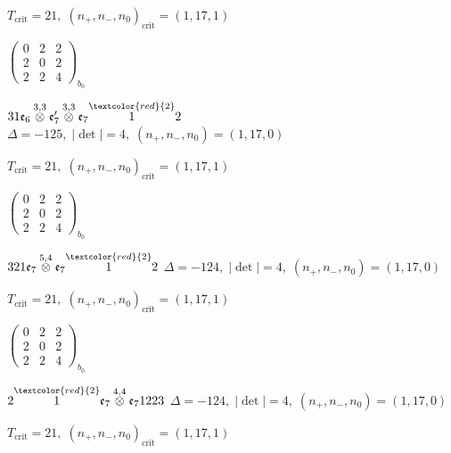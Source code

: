 \documentclass[10pt]{article}
\begin{document}
\hspace{1em}$T_{\text{crit}}=21,\; (n_+,n_-,n_0)_{\text{crit}}=(1,17,1)$

\hspace{2em}$\left(\begin{smallmatrix}0 & 2 & 2 \\ 2 & 0 & 2 \\ 2 & 2 & 4\end{smallmatrix}\right)_{\!b_0}$

\smallskip

$31\mathfrak{e}_6\overset{3,3}{\otimes}\mathfrak{e}_7'\overset{3,3}{\otimes}\mathfrak{e}_7\overset{\textcolor{red}{2}}{1}2$ \quad $\Delta=-125,\; |\det|=4,\; (n_+,n_-,n_0)=(1,17,0)$

\hspace{1em}$T_{\text{crit}}=21,\; (n_+,n_-,n_0)_{\text{crit}}=(1,17,1)$

\hspace{2em}$\left(\begin{smallmatrix}0 & 2 & 2 \\ 2 & 0 & 2 \\ 2 & 2 & 4\end{smallmatrix}\right)_{\!b_0}$

\smallskip

$321\mathfrak{e}_7\overset{5,4}{\otimes}\mathfrak{e}_7\overset{\textcolor{red}{2}}{1}2$ \quad $\Delta=-124,\; |\det|=4,\; (n_+,n_-,n_0)=(1,17,0)$

\hspace{1em}$T_{\text{crit}}=21,\; (n_+,n_-,n_0)_{\text{crit}}=(1,17,1)$

\hspace{2em}$\left(\begin{smallmatrix}0 & 2 & 2 \\ 2 & 0 & 2 \\ 2 & 2 & 4\end{smallmatrix}\right)_{\!b_0}$

\smallskip

$2\overset{\textcolor{red}{2}}{1}\mathfrak{e}_7\overset{4,4}{\otimes}\mathfrak{e}_71223$ \quad $\Delta=-124,\; |\det|=4,\; (n_+,n_-,n_0)=(1,17,0)$

\hspace{1em}$T_{\text{crit}}=21,\; (n_+,n_-,n_0)_{\text{crit}}=(1,17,1)$
\end{document}
